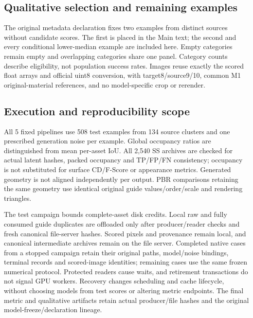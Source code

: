 \subsection{Qualitative selection and remaining examples}
The original metadata declaration fixes two examples from distinct sources
without candidate scores. The first is placed in the Main text; the second
and every conditional lower-median example are included here. Empty categories
remain empty and overlapping categories share one panel. Category counts
describe eligibility, not population success rates. Images reuse exactly the
scored float arrays and official uint8 conversion, with target8/source9/10,
common M1 original-material references, and no model-specific crop or rerender.
\ifFinalReportReady

\fi

\subsection{Execution and reproducibility scope}
All 5 fixed pipelines use 508 test examples from 134 source clusters and one
prescribed generation noise per example. Global occupancy ratios are
distinguished from mean per-asset IoU. All 2,540 SS archives are checked for
actual latent hashes, packed occupancy and TP/FP/FN consistency; occupancy is
not substituted for surface CD/F-Score or appearance metrics. Generated
geometry is not aligned independently per output. PBR comparisons retaining
the same geometry use identical original guide values/order/scale and
rendering triangles.

The test campaign bounds complete-asset disk credits. Local raw and fully
consumed guide duplicates are offloaded only after producer/reader checks
and fresh canonical file-server hashes. Scored pixels and provenance remain
local, and canonical intermediate archives remain on the file server.
Completed native cases from a stopped campaign retain their original paths,
model/noise bindings, terminal records and scored-image identities; remaining
cases use the same frozen numerical protocol. Protected readers cause waits,
and retirement transactions do not signal GPU workers. Recovery changes
scheduling and cache lifecycle, without choosing models from test scores or
altering metric endpoints.
The final metric and qualitative artifacts retain actual producer/file hashes
and the original model-freeze/declaration lineage.
